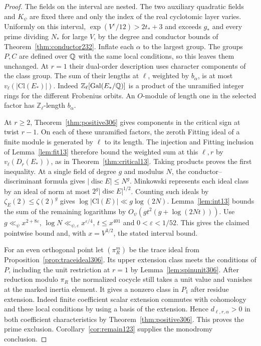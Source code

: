 \documentclass[a4paper,11pt]{article}
\theoremstyle{definition}
\theoremstyle{remark}
\newcommand{\ZZ}{\mathbb Z}\newcommand{\ord}{\operatorname{ord}}
\numberwithin{equation}{section}
\begin{document}
\begin{proof}
The fields on the interval are nested. The two auxiliary
quadratic fields and \(K_\psi\) are fixed there and only the
index of the real cyclotomic layer varies. Uniformly on this
interval, \(\exp(V^\varepsilon/12)>2t_*+3\) and exceeds
\(g_*\) and every prime dividing \(N_*\) for large \(V\),
by the degree and conductor bounds of
Theorem~\ref{thm:conductor232}. Inflate each \(\alpha\) to
the largest group. The groups \(P,C\) are defined over
\(\mathbb Q\) with the same local conditions, so this leaves them
unchanged. At \(r=1\) their dual-order description uses
character components of the class group. The sum of their
lengths at \(\ell\), weighted by \(b_\alpha\), is at most
\(v_\ell(|\mathrm{Cl}(E_*)|)\). Indeed
\(\ZZ_\ell[\operatorname{Gal}(E_*/\QQ)]\) is a product of
the unramified integer rings for the different Frobenius
orbits. An \(O\)-module of length one in the selected factor
has \(\ZZ_\ell\)-length \(b_\alpha\).

At \(r\ge2\), Theorem~\ref{thm:positive306} gives components
in the critical sign at twist \(r-1\). On each of these
unramified factors, the zeroth Fitting ideal of a finite
module is generated by \(\ell\) to its length. The injection
and Fitting inclusion of Lemma~\ref{lem:fit13} therefore
bound the weighted sum at this \(\ell,r\) by
\(v_\ell(D_r(E_*))\), as in Theorem~\ref{thm:critical13}.
Taking products proves the first inequality. At a single
field of degree \(g\) and modulus \(N\), the
conductor--discriminant formula gives
\(|\operatorname{disc}E|\le N^g\). Minkowski represents
each ideal class by an ideal of norm at most
\(2^g|\operatorname{disc}E|^{1/2}\). Counting such ideals
by \(\zeta_E(2)\le\zeta(2)^g\) gives
\(\log|\mathrm{Cl}(E)|\ll g\log(2N)\).
Lemma~\ref{lem:int13} bounds the sum of the remaining
logarithms by \(O_\psi(gt^2(g+\log(2Nt)))\). Use
\(g\ll_\psi x^{2+8\varepsilon}\),
\(\log N\ll_{\psi,\varepsilon}x^{\varepsilon/4}\),
\(t\le x^{401}\) and \(0<\varepsilon<1/52\).
This gives the claimed pointwise bound and, with
\(x=V^{3/2}\), the stated interval bound.

For an even orthogonal point let \((\pi_R^m)\) be the trace
ideal from Proposition~\ref{prop:traceideal306}. Its upper
extension class meets the conditions of \(P\), including the
unit restriction at \(r=1\) by Lemma~\ref{lem:spinunit306}.
After reduction modulo \(\pi_R\) the normalized cocycle still
takes a unit value and vanishes at the marked inertia element.
It gives a nonzero class in \(P_1\) after residue extension.
Indeed finite coefficient scalar extension commutes with
cohomology and these local conditions by using a basis of
the extension. Hence \(d_{\ell,r,\alpha}>0\) in both coefficient
characteristics by Theorem~\ref{thm:positive306}. This proves
the prime exclusion. Corollary~\ref{cor:remain123} supplies
the monodromy conclusion.


\end{proof}
\end{document}
